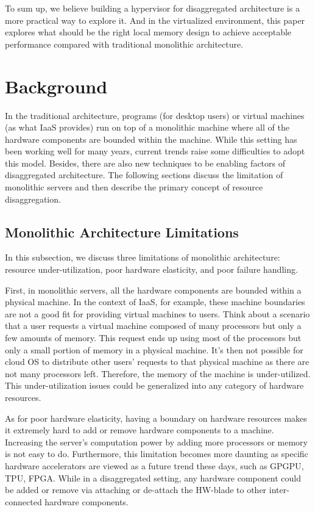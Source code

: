 \documentclass[twocolumn]{article}
\begin{document}
To sum up, we believe building a hypervisor for disaggregated architecture is a more practical way to explore it. And in the virtualized environment, this paper explores what should be the right local memory design to achieve acceptable performance compared with traditional monolithic architecture.

\section{Background}
In the traditional architecture, programs (for desktop users) or virtual machines (as what IaaS provides) run on top of a monolithic machine where all of the hardware components are bounded within the machine. While this setting has been working well for many years, current trends raise some difficulties to adopt this model. Besides, there are also new techniques to be enabling factors of disaggregated architecture. The following sections discuss the limitation of monolithic servers and then describe the primary concept of resource disaggregation.

\subsection{Monolithic Architecture Limitations}
In this subsection, we discuss three limitations of monolithic architecture: resource under-utilization, poor hardware elasticity, and poor failure handling.

First, in monolithic servers, all the hardware components are bounded within a physical machine. In the context of IaaS, for example, these machine boundaries are not a good fit for providing virtual machines to users. Think about a scenario that a user requests a virtual machine composed of many processors but only a few amounts of memory. This request ends up using most of the processors but only a small portion of memory in a physical machine. It's then not possible for cloud OS to distribute other users' requests to that physical machine as there are not many processors left. Therefore, the memory of the machine is under-utilized. This under-utilization issues could be generalized into any category of hardware resources.

As for poor hardware elasticity, having a boundary on hardware resources makes it extremely hard to add or remove hardware components to a machine. Increasing the server's computation power by adding more processors or memory is not easy to do. Furthermore, this limitation becomes more daunting as specific hardware accelerators are viewed as a future trend these days\cite{Heterogeous_computing}, such as GPGPU\cite{Google_GPGPU}, TPU\cite{TPU}, FPGA\cite{Datacenter_FPGA}. While in a disaggregated setting, any hardware component could be added or remove via attaching or de-attach the HW-blade to other inter-connected hardware components.
\end{document}
